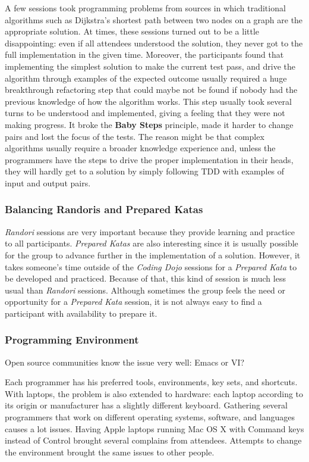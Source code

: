 A few sessions took programming problems from sources in which
traditional algorithms such as Dijkstra's shortest path between two
nodes on a graph are the appropriate solution. At times,
these sessions turned out to be a little disappointing: even if all attendees
understood the solution, they never got to the full implementation in the given
time. Moreover, the participants found that implementing the simplest solution
to make the current test pass, and drive the algorithm through examples of the
expected outcome usually required a huge breakthrough refactoring step that could
maybe not be found if nobody had the previous knowledge of how the
algorithm works. This step usually took several turns to be understood and implemented,
giving a feeling that they were not making progress. It broke the \textbf{Baby Steps}
principle, made it harder to change pairs and lost the focus of the tests.
The reason might be that complex algorithms usually require a broader knowledge
experience and, unless the programmers have the steps to drive the proper implementation
in their heads, they will hardly get to a solution by simply following TDD with examples
of input and output pairs.

\subsubsection{Balancing Randoris and Prepared Katas}

\emph{Randori} sessions are very important because they provide
learning and practice to all participants. \emph{Prepared Katas} are
also interesting since it is usually possible for the group to advance
further in the implementation of a solution. However, it takes
someone's time outside of the \emph{Coding Dojo} sessions for a
\emph{Prepared Kata} to be developed and practiced. Because of that,
this kind of session is much less usual than \emph{Randori} sessions.
Although sometimes the group feels the need or opportunity for a
\emph{Prepared Kata} session, it is not always easy to find a participant
with availability to prepare it.

\subsubsection{Programming Environment}

Open source communities know the issue very well: Emacs or VI?

Each programmer has his preferred tools, environments, key sets, and
shortcuts. With laptops, the problem is also extended to hardware:
each laptop according to its origin or manufacturer has a slightly
different keyboard. Gathering several programmers that work on
different operating systems, software, and languages causes a lot
issues. Having Apple laptops running Mac OS X with Command keys
instead of Control brought several complains from attendees. Attempts
to change the environment brought the same issues to other people.

